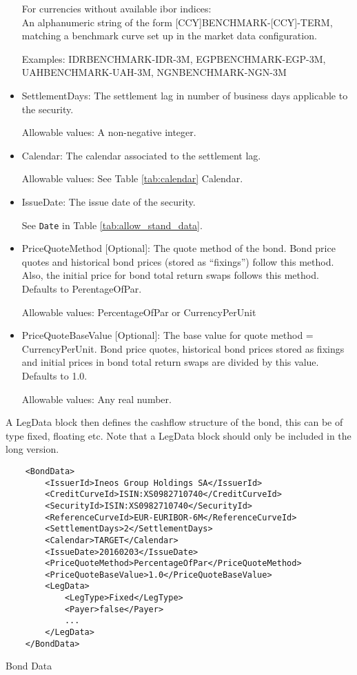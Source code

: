 \begin{itemize}
For currencies without available ibor indices:  \\
An alphanumeric string of the form [CCY]BENCHMARK-[CCY]-TERM, matching a benchmark curve set up in the market data configuration.

Examples: IDRBENCHMARK-IDR-3M, EGPBENCHMARK-EGP-3M, UAHBENCHMARK-UAH-3M, NGNBENCHMARK-NGN-3M
 
\item SettlementDays: The settlement lag in number of business days applicable to the security.

Allowable values: A non-negative integer.

\item Calendar: The calendar associated to the settlement lag.

Allowable values: See Table \ref{tab:calendar} Calendar.

\item IssueDate: The issue date of the security.

See \lstinline!Date! in Table \ref{tab:allow_stand_data}.

\item PriceQuoteMethod [Optional]: The quote method of the bond. Bond price quotes and historical bond prices (stored as
  ``fixings'') follow this method. Also, the initial price for bond total return swaps follows this method. Defaults to
  PerentageOfPar.

  Allowable values: PercentageOfPar or CurrencyPerUnit

\item PriceQuoteBaseValue [Optional]: The base value for quote method = CurrencyPerUnit. Bond price quotes, historical
  bond prices stored as fixings and initial prices in bond total return swaps are divided by this value. Defaults to
  1.0.

  Allowable values: Any real number.

\end{itemize}

A LegData block then defines the cashflow structure of the bond, this can be of type fixed, floating etc. Note that a LegData block should only be included in the long version. 

\begin{listing}[H]
\begin{verbatim}
    <BondData>
        <IssuerId>Ineos Group Holdings SA</IssuerId>
        <CreditCurveId>ISIN:XS0982710740</CreditCurveId>
        <SecurityId>ISIN:XS0982710740</SecurityId>
        <ReferenceCurveId>EUR-EURIBOR-6M</ReferenceCurveId>
        <SettlementDays>2</SettlementDays>
        <Calendar>TARGET</Calendar>
        <IssueDate>20160203</IssueDate>
        <PriceQuoteMethod>PercentageOfPar</PriceQuoteMethod>
        <PriceQuoteBaseValue>1.0</PriceQuoteBaseValue>
        <LegData>
            <LegType>Fixed</LegType>
            <Payer>false</Payer>
            ...
        </LegData>
    </BondData>
\end{verbatim}
\caption{Bond Data}
\label{lst:bonddata}
\end{listing}


